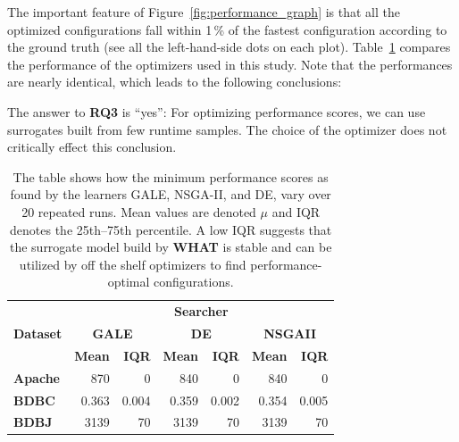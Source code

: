 \documentclass{newsig}
\newcommand{\fig}[1]{Figure~\ref{fig:#1}}
\newcommand{\what}{{\bf WHAT }}
\begin{document}
The important feature of \fig{performance_graph} is that all the optimized configurations fall within 1\,\% of the fastest
configuration according to the ground truth (see all the left-hand-side dots on each plot). Table~\ref{fig:external_validity} compares the performance of the optimizers
used in this study. Note that the performances are nearly identical, which leads to the following conclusions:

\begin{myshadowbox}
The answer to {\bf RQ3} is ``yes'': For optimizing performance scores, we can use surrogates built from few runtime samples. The choice of the optimizer does not critically effect this conclusion.
\end{myshadowbox}


\begin{table}[tbh]
\caption{The table shows how the minimum performance scores as found by the learners GALE, NSGA-II, and DE, vary over 20 repeated
runs. Mean values are denoted $\mu$ and IQR denotes the 25th--75th percentile. A low IQR suggests that the surrogate model build by \what is stable and can be utilized by off the shelf optimizers to find performance-optimal configurations.
}
\label{fig:external_validity}
\vspace{2ex}
\begin{tabular}{lrrrrrr}
\toprule
\multirow{3}{*}{\textbf{Dataset}} & \multicolumn{6}{c}{\textbf{Searcher}}                                                                       \\ \cmidrule{2-7} 
                                  & \multicolumn{2}{c}{\textbf{GALE}} & \multicolumn{2}{c}{\textbf{DE}} & \multicolumn{2}{c}{\textbf{NSGAII}} \\ \cmidrule{2-7} 
                                  & \textbf{Mean}    & \textbf{IQR}    & \textbf{Mean}   & \textbf{IQR}   & \textbf{Mean}     & \textbf{IQR}     \\ \midrule
\textbf{Apache}                   & 870              & 0               & 840             & 0              & 840               & 0                \\ 
\textbf{BDBC}                     & 0.363            & 0.004           & 0.359           & 0.002          & 0.354             & 0.005            \\ 
\textbf{BDBJ}                     & 3139             & 70              & 3139            & 70             & 3139              & 70               \\ 

\end{tabular}
\end{table}
\end{document}
